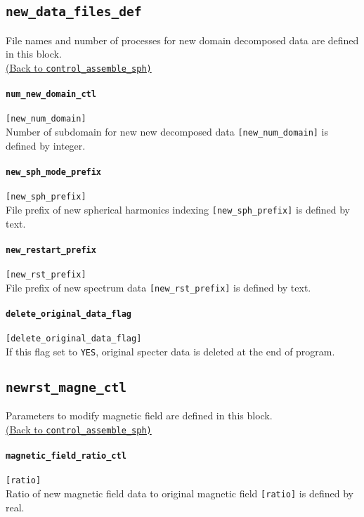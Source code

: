\subsection{\tt new\_data\_files\_def}
\label{href_t:new_data_files_def}
File names and number of processes for new domain decomposed data are defined in this block. \\
\hyperref[href_i:new_data_files_def]{(Back to {\tt control\_assemble\_sph)}}

\paragraph{\tt num\_new\_domain\_ctl}
\label{href_t:num_new_domain_ctl}
\verb|[new_num_domain]| \\
Number of subdomain for new new decomposed data \verb|[new_num_domain]| is defined by integer.

\paragraph{\tt new\_sph\_mode\_prefix}
\label{href_t:new_sph_mode_prefix}
\verb|[new_sph_prefix]| \\
File prefix of new spherical harmonics indexing \verb|[new_sph_prefix]| is defined by text.

\paragraph{\tt new\_restart\_prefix}
\label{href_t:new_restart_prefix}
\verb|[new_rst_prefix]| \\
File prefix of new spectrum data \verb|[new_rst_prefix]| is defined by text.

\paragraph{\tt delete\_original\_data\_flag}
\label{href_t:delete_original_data_flag}
\verb|[delete_original_data_flag]| \\
If this flag set to \verb|YES|, original specter data is deleted at the end of program. 

\subsection{\tt newrst\_magne\_ctl}
\label{href_t:newrst_magne_ctl}
Parameters to modify magnetic field are defined in this block. \\
\hyperref[href_i:newrst_magne_ctl]{(Back to {\tt control\_assemble\_sph)}}

\paragraph{\tt magnetic\_field\_ratio\_ctl}
\label{href_t:magnetic_field_ratio_ctl} 
\verb|[ratio]| \\
Ratio of new magnetic field data to original magnetic field \verb|[ratio]| is defined by real.
